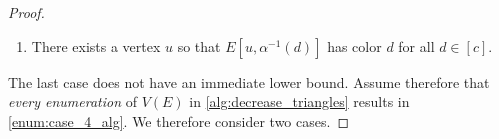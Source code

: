 \documentclass[a4paper,11pt]{article}
\numberwithin{equation}{section}
\begin{document}
\begin{proof}
\begin{enumerate}

        \item \label{enum:case_4_alg} There exists a vertex $u$ so that $E[u,\alpha^{-1}(d)]$ has color $d$ for all $d\in [c]$.




    \end{enumerate}
    
    The last case does not have an immediate lower bound. Assume therefore that \emph{every enumeration} of $V(E)$ in \cref{alg:decrease_triangles}
    results in  \cref{enum:case_4_alg}. We therefore consider two cases.


\end{proof}
\end{document}
